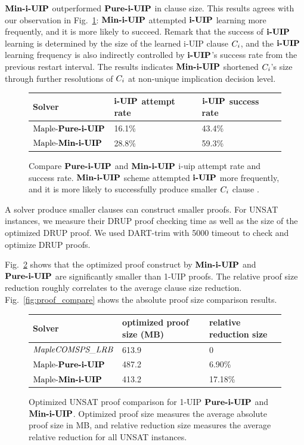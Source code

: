 $\textbf{Min-i-UIP}$ outperformed $\textbf{Pure-i-UIP}$ in clause size.  This results agrees with our observation in Fig.~\ref{fig:t2}: $\textbf{Min-i-UIP}$ attempted $\textbf{i-UIP}$ learning more frequently, and it is more likely to succeed. Remark that the success of $\textbf{i-UIP}$ learning is determined by the size of the learned i-UIP clause $C_{i}$, and the $\textbf{i-UIP}$ learning frequency is also indirectly controlled by $\textbf{i-UIP}$'s success rate from the previous restart interval. The results indicates  $\textbf{Min-i-UIP}$ shortened $C_{i}$'s size through further resolutions of $C_{i}$ at non-unique implication decision level. 

\begin{figure} 
\begin{center} 
\begin{tabular}{ | m{3.5cm} | m{5cm}| m{5cm} | } 
\hline
Solver & $\textbf{i-UIP}$ attempt rate & $\textbf{i-UIP}$ success rate  \\ 
\hline
$\text{Maple-\textbf{Pure-i-UIP}}$ & 16.1\% & 43.4\% \\ 
\hline
$\text{Maple-\textbf{Min-i-UIP}}$ & 28.8\% & 59.3\% \\ 
\hline
\end{tabular}
\end{center}
\caption{Compare $\textbf{Pure-i-UIP}$ and $\textbf{Min-i-UIP}$ i-uip attempt rate and success rate. $\textbf{Min-i-UIP}$ scheme attempted $\textbf{i-UIP}$ more frequently, and it is more likely to successfully produce smaller $C_{i}$ clause .}
\label{fig:t2}
\end{figure}

A solver produce smaller clauses can construct smaller proofs. For UNSAT instances, we measure their DRUP\cite{} proof checking time as well as the size of the optimized DRUP proof. We used DART-trim \cite{} with 5000 timeout to check and optimize DRUP proofs. 

Fig.~\ref{fig:t3} shows that the optimized proof construct by $\textbf{Min-i-UIP}$ and $\textbf{Pure-i-UIP}$ are significantly smaller than 1-UIP proofs. The relative proof size reduction roughly correlates to the average clause size reduction. Fig.~\ref{fig:proof_compare} shows the absolute proof size comparison results. 

\begin{figure} 
\begin{center} 
\begin{tabular}{ | m{3.5cm} | m{5cm}| m{5cm} | } 
\hline
Solver & optimized proof size (MB) & relative reduction size  \\ 
\hline
$\textit{MapleCOMSPS\_LRB}$ & 613.9 & 0  \\ 
\hline
$\text{Maple-\textbf{Pure-i-UIP}}$ & 487.2 & 6.90\% \\ 
\hline
$\text{Maple-\textbf{Min-i-UIP}}$ & 413.2 & 17.18\% \\ 
\hline
\end{tabular}
\end{center}
\caption{Optimized UNSAT proof comparison for 1-UIP $\textbf{Pure-i-UIP}$ and $\textbf{Min-i-UIP}$. Optimized proof size measures the average absolute proof size in MB, and relative reduction size measures the average relative reduction for all UNSAT instances.}
\label{fig:t3}
\end{figure}

